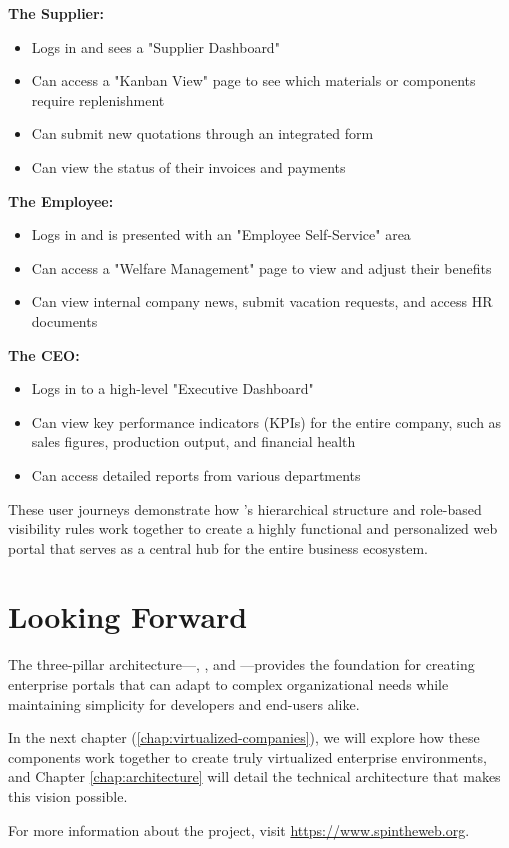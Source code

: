 \textbf{The Supplier:}
\begin{itemize}
	\item Logs in and sees a "Supplier Dashboard"
	\item Can access a "Kanban View" page to see which materials or components require replenishment
	\item Can submit new quotations through an integrated form
	\item Can view the status of their invoices and payments
\end{itemize}

\textbf{The Employee:}
\begin{itemize}
	\item Logs in and is presented with an "Employee Self-Service" area
	\item Can access a "Welfare Management" page to view and adjust their benefits
	\item Can view internal company news, submit vacation requests, and access HR documents
\end{itemize}

\textbf{The CEO:}
\begin{itemize}
	\item Logs in to a high-level "Executive Dashboard"
	\item Can view key performance indicators (KPIs) for the entire company, such as sales figures, production output, and financial health
	\item Can access detailed reports from various departments
\end{itemize}

These user journeys demonstrate how \wbdl{}'s hierarchical structure and role-based visibility rules work together to create a highly functional and personalized web portal that serves as a central hub for the entire business ecosystem.

\section{Looking Forward}
\label{sec:looking-forward}

The three-pillar architecture—\wbdl{}, \webspinner{}, and \studio{}—provides the foundation for creating enterprise portals that can adapt to complex organizational needs while maintaining simplicity for developers and end-users alike.

In the next chapter (\cref{chap:virtualized-companies}), we will explore how these components work together to create truly virtualized enterprise environments, and Chapter \ref{chap:architecture} will detail the technical architecture that makes this vision possible.

For more information about the project, visit \url{https://www.spintheweb.org}.
